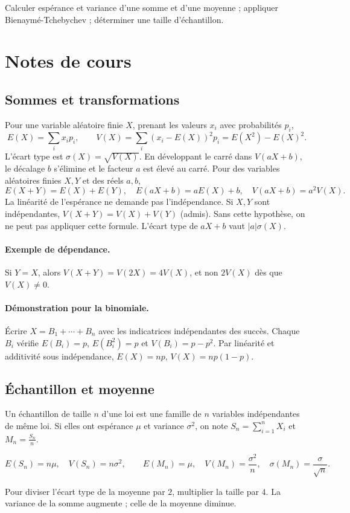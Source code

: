 \label{ch:14}


\begin{keypoint}[Objectifs]Calculer espérance et variance d'une somme et d'une moyenne ; appliquer Bienaymé-Tchebychev ; déterminer une taille d'échantillon.\end{keypoint}

\section{Notes de cours}
\subsection{Sommes et transformations}
Pour une variable aléatoire finie $X$, prenant les valeurs $x_i$ avec probabilités $p_i$,
\[E(X)=\sum_i x_ip_i,\qquad V(X)=\sum_i(x_i-E(X))^2p_i=E(X^2)-E(X)^2.\]
L'écart type est $\sigma(X)=\sqrt{V(X)}$. En développant le carré dans $V(aX+b)$, le décalage $b$ s'élimine et le facteur $a$ est élevé au carré.
Pour des variables aléatoires finies $X,Y$ et des réels $a,b$,
\[E(X+Y)=E(X)+E(Y),\quad E(aX+b)=aE(X)+b,\quad V(aX+b)=a^2V(X).\]
La linéarité de l'espérance ne demande pas l'indépendance. Si $X,Y$ sont indépendantes, $V(X+Y)=V(X)+V(Y)$ (admis). Sans cette hypothèse, on ne peut pas appliquer cette formule. L'écart type de $aX+b$ vaut $|a|\sigma(X)$.
\paragraph{Exemple de dépendance.} Si $Y=X$, alors $V(X+Y)=V(2X)=4V(X)$, et non $2V(X)$ dès que $V(X)\ne0$.
\paragraph{Démonstration pour la binomiale.} Écrire $X=B_1+\cdots+B_n$ avec les indicatrices indépendantes des succès. Chaque $B_i$ vérifie $E(B_i)=p$, $E(B_i^2)=p$ et $V(B_i)=p-p^2$. Par linéarité et additivité sous indépendance, $E(X)=np$, $V(X)=np(1-p)$.
\subsection{Échantillon et moyenne}
Un échantillon de taille $n$ d'une loi est une famille de $n$ variables indépendantes de même loi. Si elles ont espérance $\mu$ et variance $\sigma^2$, on note $S_n=\sum_{i=1}^nX_i$ et $M_n=\frac{S_n}{n}$.
\begin{keypoint}
\[E(S_n)=n\mu,\quad V(S_n)=n\sigma^2,\qquad E(M_n)=\mu,\quad V(M_n)=\frac{\sigma^2}{n},\quad\sigma(M_n)=\frac\sigma{\sqrt n}.\]
\end{keypoint}
Pour diviser l'écart type de la moyenne par $2$, multiplier la taille par $4$. La variance de la somme augmente ; celle de la moyenne diminue.
